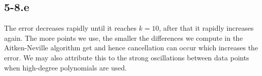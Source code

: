 \documentclass{article}
\begin{document}
\subsection*{5-8.e} The error decreases rapidly until it reaches $k = 10$, after that it rapidly increases again. The more points we use, the smaller the differences we compute in the Aitken-Neville algorithm get and hence cancellation can occur which increases the error. We may also attribute this to the strong oscillations between data points when high-degree polynomials are used.
\end{document}
